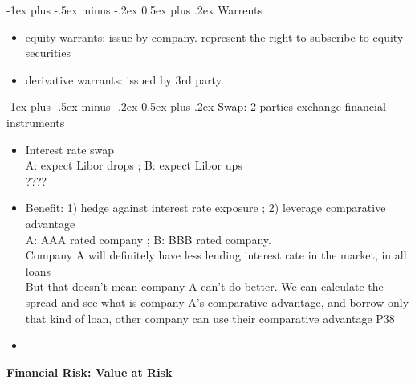 \documentclass[10pt,landscape]{article}
\makeatletter
\renewcommand{\section}{\@startsection{section}{1}{0mm}%
                                {-1ex plus -.5ex minus -.2ex}%
                                {0.5ex plus .2ex}%
                                {\normalfont\large\bfseries}}
\makeatother
\begin{document}
\begin{multicols}{2}
\begin{itemize}
\end{itemize}

\section{Warrents}
\begin{itemize}
	\item equity warrants: issue by company. represent the right to subscribe to equity securities
	\item derivative warrants: issued by 3rd party.
\end{itemize}

\section{Swap: 2 parties exchange financial instruments}
\begin{itemize}
	\item Interest rate swap\\
			A: expect Libor drops ; B: expect Libor ups\\
			????
	\item Benefit: 1) hedge against interest rate exposure ; 2) leverage comparative advantage\\
			A: AAA rated company ; B: BBB rated company.\\
			Company A will definitely have less lending interest rate in the market, in all loans\\
			But that doesn't mean company A can't do better. We can calculate the spread and see what is company A's comparative advantage, and borrow only that kind of loan, other company can use their comparative advantage P38
	\item 
\end{itemize}


\end{multicols}







\newpage

\begin{center}
     \Large{\textbf{Financial Risk: Value at Risk}} \\
\end{center}
\end{document}
